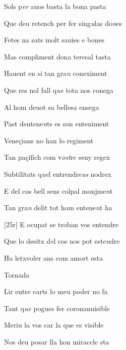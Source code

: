 \documentclass[12pt]{article}
\begin{document}
\begin{estrofa}

 Sols p\textit{er} auos basta la bona pasta

 Que deu retench per fer sing\textit{u}las do\textit{n}es

 Fetes na sats molt sauies e bones

 Mas compliment dona teresal tasta

 Hauent en si tan gra\textit{n} coneximent

 Que res nol fall q\textit{ue} tota nos conega

 Al hom deuot sa bellesa ensega

 Past dentene\textit{n}ts es son enteniment

\end{estrofa}



\begin{estrofa}

 Vene\c{c}ians no han lo regiment

 Tan pa\c{c}ifich com v\textit{ost}re seny regex

 Subtilitats q\textit{ue}l entrendre\textit{us} nodrex

 E del cos bell sens colpal monjme\textit{n}t

 Tan gra\textit{n} delit tot hom entene\textit{n}t ha

 [25r] E ocupat se troban vos entendre

 Que lo desitx d\textit{e}l cos nos pot este\textit{n}dre

 Ha letxvoler ans com amort esta

\end{estrofa}


\begin{estrofaExtra}%




\begin{tornada}

Tornada

\end{tornada}


\end{estrofaExtra}


\begin{estrofa}

 Lir entre carts lo meu poder no fa

 Tant q\textit{ue} pogues fer coronanuisible

 Meriu la vos car la que es visible

 Nos deu posar lla hon miraccle sta

\end{estrofa}
\end{document}
